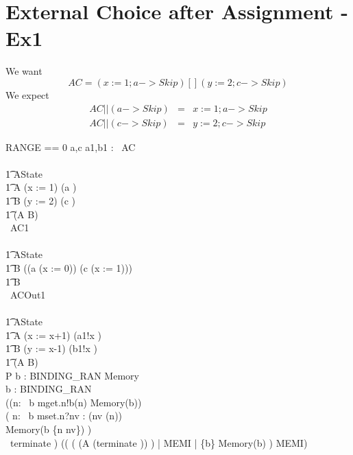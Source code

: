 \section{External Choice after Assignment - Ex1}

We want
\[
  AC = ( x:=1 ; a -> Skip ) [] (y:=2 ; c -> Skip)
\]
We expect
\begin{eqnarray}
   AC || (a -> Skip)  &=&  x:=1 ; a -> Skip
\\ AC || (c -> Skip)  &=&  y:=2 ; c -> Skip
\end{eqnarray}

\begin{circus}
RANGE == 0 
\also \circchannel a,c
\also \circchannel a1,b1 : \nat
\also
\circprocess\ AC \circdef\\
\circbegin\\
\t1 \circstate AState \\
\t1 A \circdef (x := 1) \circseq (a \then \Skip) \\
\t1 B \circdef (y := 2) \circseq (c \then \Skip) \\
\t1 \circspot (A \extchoice B)\\
\circend
\also
\circprocess\ AC1 \circdef\\
\circbegin\\
\t1 \circstate AState \\
\t1 B \circdef ((a \then (x := 0)) \extchoice (c \then (x := 1))) \\
\t1 \circspot B\\
\circend
\also
\circprocess\ ACOut1 \circdef\\
\circbegin\\
\t1 \circstate AState \\
\t1 A \circdef (x := x+1) \circseq (a1!x \then \Skip) \\
\t1 B \circdef (y := x-1) \circseq (b1!x \then \Skip) \\
\t1 \circspot (A \extchoice B)\\
\circend
\also
\circprocess P \circdef b : BINDING\_RAN \circspot
    \circbegin
      Memory \circdef\\
        \circvres b : BINDING\_RAN \circspot \\
        ((\Extchoice n: \dom\ b \circspot mget.n!b(n) \then Memory(b))\\
        \extchoice (
        \Extchoice n: \dom\ b \circspot
          mset.n?nv : (nv \in \delta(n)) \then\\
          Memory(b \oplus \{n \mapsto nv\})
        )\\
        \extchoice~terminate \then \Skip)
      \circspot (( (
            (A \circseq (terminate \then \Skip))
        ) \lpar \emptyset | MEMI | \{b\} \rpar Memory(b)
        ) \circhide MEMI)
  \circend\\
\end{circus}
